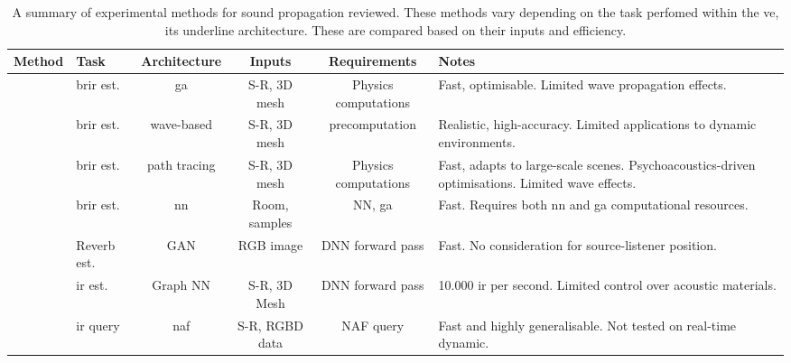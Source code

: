 \begin{landscape}
    \begin{table}[tbp]
        \centering
        \caption[A summary of experimental methods for sound propagation]{A summary of experimental methods for sound propagation reviewed. These methods vary depending on the task perfomed within the \acrshort{ve}, its underline architecture. These are compared based on their inputs and efficiency.}
            
            \begin{tabularx}{\linewidth}{llcccX}
                \toprule
                Method                                            & Task                     & Architecture   & Inputs                        & Requirements        & Notes \\ \midrule
                \cite{schroder2011physically} & \acrshort{brir} est.     & \acrshort{ga}  & S-R, 3D mesh   & Physics computations              & Fast, optimisable. Limited wave propagation effects. \\
                \cite{mehra2015wave}                              & \acrshort{brir} est.     & wave-based     & S-R, 3D mesh                  & precomputation      & Realistic, high-accuracy. Limited applications to dynamic environments. \\
                \cite{schissler2016interactive}                   & \acrshort{brir} est.     & path tracing   & S-R, 3D mesh                  & Physics computations & Fast, adapts to large-scale scenes. Psychoacoustics-driven optimisations. Limited wave effects. \\
                \cite{tang2020scene}                              & \acrshort{brir} est.     & \acrshort{nn}  & Room, samples\footnotemark[1] & NN, \acrshort{ga}   & Fast. Requires both \acrshort{nn} and \acrshort{ga} computational resources.\\
                \cite{Singh_2021_ICCV}                            & Reverb est.              & GAN            & RGB image                     & DNN forward pass    & Fast. No consideration for source-listener position. \\
                \cite{ratnarajah2022mesh2ir}                      & \acrshort{ir} est.       & Graph NN       & S-R, 3D Mesh                  & DNN forward pass    & 10.000 \acrshort{ir} per second\footnotemark[2]. Limited control over acoustic materials.\\
                \cite{liang2023neural}                            & \acrshort{ir} query      & \acrshort{naf} & S-R, RGBD data                & NAF query           & Fast and highly generalisable. Not tested on real-time dynamic.\\ 

\end{tabularx}
\end{table}
\end{landscape}
